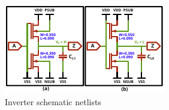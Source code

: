 
\begin{figure}[h]
	\centering
	\includegraphics[width=\columnwidth]{./figures/IVX4.pdf}
	\caption{Inverter schematic netlists}
	\label{ivxbufmos}
\end{figure}
